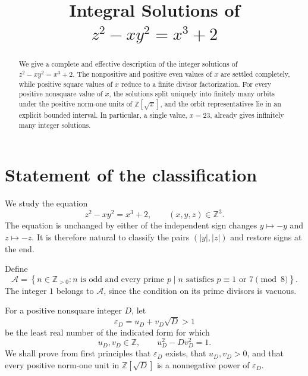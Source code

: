 \documentclass[a4paper,11pt]{amsart}
\title[Integral solutions of a cubic norm equation]
{Integral Solutions of \texorpdfstring{$z^2-xy^2=x^3+2$}{z2-xy2=x3+2}}
\author{}
\date{}
\numberwithin{equation}{section}
\theoremstyle{definition}
\theoremstyle{remark}
\newcommand{\Z}{\mathbb Z}
\newcommand{\eps}{\varepsilon}
\newcommand{\Acal}{\mathcal A}
\begin{document}
\begin{abstract}
We give a complete and effective description of the integer solutions of
\(z^2-xy^2=x^3+2\).  The nonpositive and positive even values of \(x\) are
settled completely, while positive square values of \(x\) reduce to a finite
divisor factorization.  For every positive nonsquare value of \(x\), the
solutions split uniquely into finitely many orbits under the positive
norm-one units of \(\Z[\sqrt{x}]\), and the orbit representatives lie in an
explicit bounded interval.  In particular, a single value, \(x=23\), already
gives infinitely many integer solutions.
\end{abstract}

\maketitle

\section{Statement of the classification}

We study the equation
\begin{equation}\label{eq:main}
 z^2-xy^2=x^3+2,
 \qquad (x,y,z)\in\Z^3.
\end{equation}
The equation is unchanged by either of the independent sign changes
\(y\mapsto-y\) and \(z\mapsto-z\).  It is therefore natural to classify the
pairs \((|y|,|z|)\) and restore signs at the end.

Define
\begin{equation}\label{eq:Adef}
 \Acal=
 \left\{
 n\in\Z_{>0}:
 n\text{ is odd and every prime }p\mid n
 \text{ satisfies }p\equiv1\text{ or }7\pmod 8
 \right\}.
\end{equation}
The integer \(1\) belongs to \(\Acal\), since the condition on its prime
divisors is vacuous.

For a positive nonsquare integer \(D\), let
\begin{equation}\label{eq:fundamental-unit}
 \eps_D=u_D+v_D\sqrt D>1
\end{equation}
be the least real number of the indicated form for which
\begin{equation}\label{eq:pell-unit}
 u_D,v_D\in\Z,
 \qquad
 u_D^2-Dv_D^2=1.
\end{equation}
We shall prove from first principles that \(\eps_D\) exists, that
\(u_D,v_D>0\), and that every positive norm-one unit in \(\Z[\sqrt D]\) is a
nonnegative power of \(\eps_D\).
\end{document}
